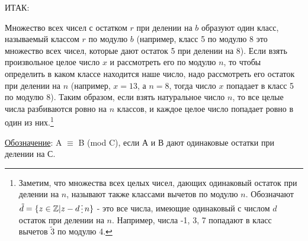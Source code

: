 \newpage

ИТАК:

Множество всех чисел $с$ остатком $r$ при делении на $b$ образуют один класс, называемый классом $r$ по модулю $b$ (например, класс 5 по модулю 8 это множество всех чисел, которые дают остаток 5 при делении на 8). Если взять произвольное целое число $x$ и рассмотреть его по модулю $n$, то чтобы определить в каком классе находится наше число, надо рассмотреть его остаток при делении на $n$ (например, $x = 13$, а $n = 8$, тогда число $x$ попадает в класс 5 по модулю 8). Таким образом, если взять натуральное число $n$, то все целые числа разбиваются ровно на $n$ классов, и каждое целое число попадает ровно в один из них.\footnote{Заметим, что множества всех целых чисел, дающих одинаковый остаток при делении на $n$, называют также классами вычетов по модулю $n$. Обозначают $ \tilde{d} = \{ z \in \mathbb{Z} | z - d \del n\}$ - это все числа, имеющие одинаковый с числом $d$ остаток при делении на $n$. Например, числа -1, 3, 7 попадают в класс вычетов $\tilde{3}$ по модулю 4.}

\underline{Обозначение}: A $\equiv$ B (mod C), если А и В дают одинаковые остатки при делении на С.


